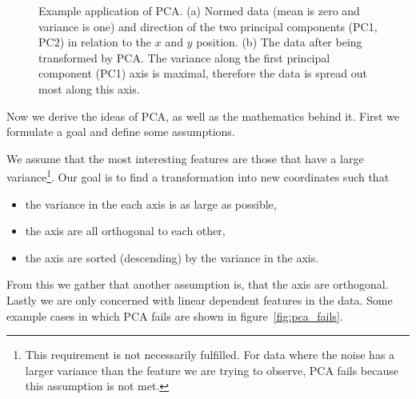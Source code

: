 \begin{figure}
	\caption{Example application of PCA. \newline (a) Normed data (mean is zero and variance is one) and direction of the two principal components (PC1, PC2) in relation to the $x$ and $y$ position. \newline (b) The data after being transformed by PCA. The variance along the first principal component (PC1) axis is maximal, therefore the data is spread out most along this axis.}
	\label{fig:pca_example}
\end{figure}

Now we derive the ideas of PCA, as well as the mathematics behind it. First we formulate a goal and define some assumptions.

We assume that the most interesting features are those that have a large variance\footnote{\color{change} This requirement is not necessarily fulfilled. \color{black} For data where the noise has a larger variance than the feature we are trying to observe, PCA fails because this assumption is not met.}. Our goal is to find a transformation into new coordinates such that
\begin{itemize}
	\item the variance in the each axis is as large as possible,
	\item the axis are all orthogonal to each other,
	\item the axis are sorted (descending) by the variance in the axis.
\end{itemize}

From this we gather that another assumption is, that the axis are orthogonal. Lastly we are only concerned with linear dependent features in the data. Some example cases in which PCA fails are shown in figure~\ref{fig:pca_fails}.

\newpage

